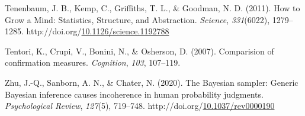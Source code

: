 \documentclass[10pt, letterpaper]{article}
\newenvironment{CSLReferences}%
  {}%
  {\par}
\begin{document}
\begin{CSLReferences}{1}{0}
\leavevmode{}%
Tenenbaum, J. B., Kemp, C., Griffiths, T. L., \& Goodman, N. D. (2011).
How to {Grow} a {Mind}: {Statistics}, {Structure}, and {Abstraction}.
\emph{Science}, \emph{331}(6022), 1279--1285.
http://doi.org/\href{https://doi.org/10.1126/science.1192788}{10.1126/science.1192788}

\leavevmode{}%
Tentori, K., Crupi, V., Bonini, N., \& Osherson, D. (2007). Comparision
of confirmation measures. \emph{Cognition}, \emph{103}, 107--119.

\leavevmode{}%
Zhu, J.-Q., Sanborn, A. N., \& Chater, N. (2020). The {Bayesian}
sampler: {Generic} {Bayesian} inference causes incoherence in human
probability judgments. \emph{Psychological Review}, \emph{127}(5),
719--748.
http://doi.org/\href{https://doi.org/10.1037/rev0000190}{10.1037/rev0000190}

\end{CSLReferences}


\end{document}

